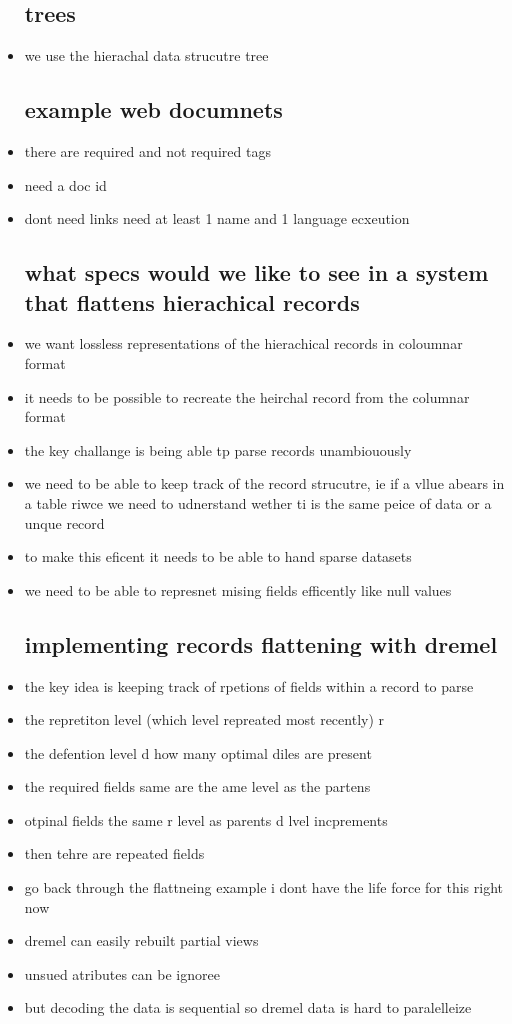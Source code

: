 \documentclass{article}
\begin{document}
\begin{itemize}
\subsection*{trees}
\item we use the hierachal data strucutre tree 
\subsection*{example web documnets}
\item there are required and not required tags 
\item need a doc id 
\item dont need links need at least 1 name and 1 language ecxeution
\subsection*{what specs would we like to see in a system that flattens hierachical records}
\item we want lossless representations of the hierachical records in coloumnar format
\item it needs to be possible to recreate the heirchal record from the columnar format 
\item the key challange is being able tp parse records unambiouously 
\item we need to be able to keep track of the record strucutre, ie if a vllue abears in a table riwce we need to udnerstand wether ti is the same peice of data or a unque record 
\item to make this eficent it needs to be able to hand sparse datasets 
\item we need to be able to represnet mising fields efficently like null values 
\subsection*{implementing records flattening with  dremel}
\item the key idea is keeping track of rpetions of fields within a record to parse 
\item the repretiton level  (which level repreated most recently) r 
\item the defention level d how many optimal diles are present 
\item the required fields same are the ame level as the partens 
\item otpinal fields the same r level as parents d lvel incprements 
\item then tehre are repeated fields 
\item go back through the flattneing example i dont have the life force for this right now 
\item dremel can easily rebuilt partial views 
\item unsued atributes can be ignoree 
\item but decoding the data is sequential so dremel data is hard to paralelleize

\end{itemize}
\end{document}
